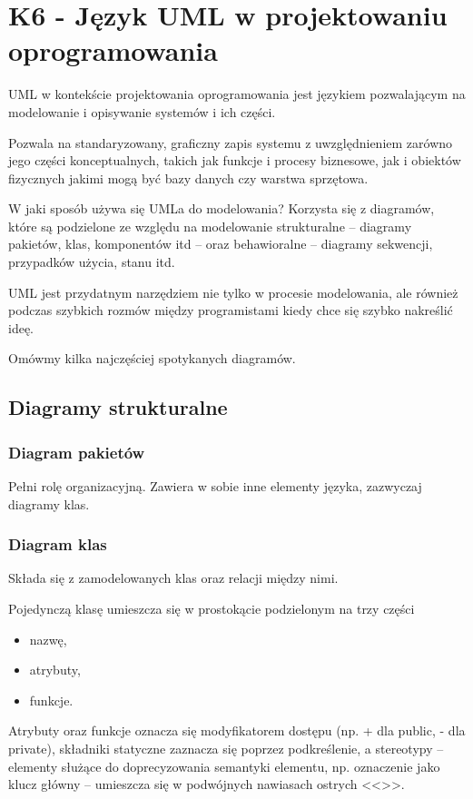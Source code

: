 \section{K6 - Język UML w projektowaniu oprogramowania}

UML w kontekście projektowania oprogramowania jest językiem pozwalającym na modelowanie i opisywanie systemów i ich części.

Pozwala na standaryzowany, graficzny zapis systemu z uwzględnieniem zarówno jego części konceptualnych, takich jak funkcje i procesy biznesowe, jak i obiektów fizycznych jakimi mogą być bazy danych czy warstwa sprzętowa.

W jaki sposób używa się UMLa do modelowania? Korzysta się z diagramów, które są podzielone ze względu na modelowanie strukturalne -- diagramy pakietów, klas, komponentów itd -- oraz behawioralne -- diagramy sekwencji, przypadków użycia, stanu itd.

UML jest przydatnym narzędziem nie tylko w procesie modelowania, ale również podczas szybkich rozmów między programistami kiedy chce się szybko nakreślić ideę.

Omówmy kilka najczęściej spotykanych diagramów.

\subsection{Diagramy strukturalne}
\subsubsection{Diagram pakietów}
Pełni rolę organizacyjną. Zawiera w sobie inne elementy języka, zazwyczaj diagramy klas.

\subsubsection{Diagram klas}
Składa się z zamodelowanych klas oraz relacji między nimi.

Pojedynczą klasę umieszcza się w prostokącie podzielonym na trzy części
\begin{itemize}
	\item{nazwę,}
	\item{atrybuty,}
	\item{funkcje.}
\end{itemize}

Atrybuty oraz funkcje oznacza się modyfikatorem dostępu (np. + dla public, - dla private), składniki statyczne zaznacza się poprzez podkreślenie, a stereotypy -- elementy służące do doprecyzowania semantyki elementu, np. oznaczenie jako klucz główny -- umieszcza się w podwójnych nawiasach ostrych <<>>.

